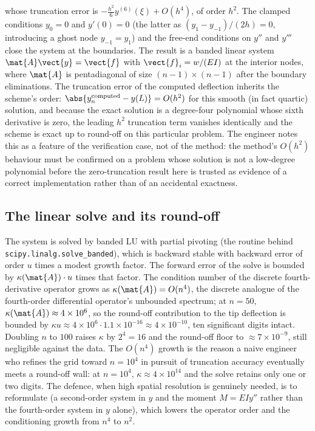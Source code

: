 whose truncation error is $-\frac{h^{2}}{6} y^{(6)}(\xi) + O(h^{4})$, of
order $h^{2}$. The clamped conditions $y_{0} = 0$ and $y'(0) = 0$ (the
latter as $(y_{1} - y_{-1})/(2h) = 0$, introducing a ghost node $y_{-1} =
y_{1}$) and the free-end conditions on $y''$ and $y'''$ close the system at
the boundaries. The result is a banded linear system $\mat{A}\vect{y} =
\vect{f}$ with $\vect{f}_{i} = w/(E I)$ at the interior nodes, where
$\mat{A}$ is pentadiagonal of size $(n - 1) \times (n - 1)$ after the
boundary eliminations. The truncation error of the computed deflection
inherits the scheme's order: $\abs{y_{n}^{\text{computed}} - y(L)} =
O(h^{2})$ for this smooth (in fact quartic) solution, and because the exact
solution is a degree-four polynomial whose sixth derivative is zero, the
leading $h^{2}$ truncation term vanishes identically and the scheme is
exact up to round-off on this particular problem. The engineer notes this
as a feature of the verification case, not of the method: the method's
$O(h^{2})$ behaviour must be confirmed on a problem whose solution is not
a low-degree polynomial before the zero-truncation result here is trusted
as evidence of a correct implementation rather than of an accidental
exactness.

\subsection{The linear solve and its round-off}

The system is solved by banded LU with partial pivoting (the routine behind
\texttt{scipy.linalg.solve\_banded}), which is backward stable with
backward error of order $u$ times a modest growth factor. The forward error
of the solve is bounded by $\kappa(\mat{A}) \cdot u$ times that factor. The
condition number of the discrete fourth-derivative operator grows as
$\kappa(\mat{A}) = O(n^{4})$, the discrete analogue of the
fourth-order differential operator's unbounded spectrum; at $n = 50$,
$\kappa(\mat{A}) \approx 4 \times 10^{6}$, so the round-off contribution to
the tip deflection is bounded by $\kappa u \approx 4 \times 10^{6} \cdot
1.1 \times 10^{-16} \approx 4 \times 10^{-10}$, ten significant digits
intact. Doubling $n$ to $100$ raises $\kappa$ by $2^{4} = 16$ and the
round-off floor to $\approx 7 \times 10^{-9}$, still negligible against the
data. The $O(n^{4})$ growth is the reason a naive engineer who refines the
grid toward $n = 10^{4}$ in pursuit of truncation accuracy eventually meets
a round-off wall: at $n = 10^{4}$, $\kappa \approx 4 \times 10^{14}$ and
the solve retains only one or two digits. The defence, when high spatial
resolution is genuinely needed, is to reformulate (a second-order system
in $y$ and the moment $M = E I y''$ rather than the fourth-order system in
$y$ alone), which lowers the operator order and the conditioning growth
from $n^{4}$ to $n^{2}$.

